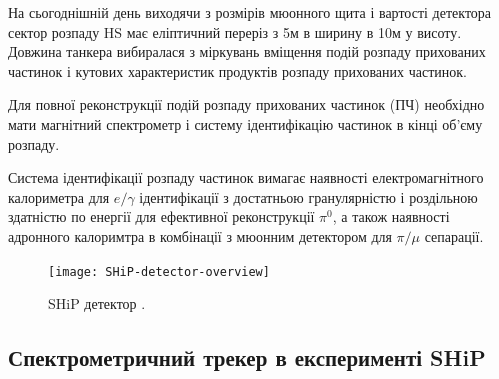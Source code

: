 	На сьогоднішній день виходячи з розмірів мюонного щита і вартості детектора  сектор розпаду HS має еліптичний переріз з 5м в ширину в 10м у висоту. Довжина танкера вибиралася з міркувань вміщення подій розпаду прихованих частинок і кутових характеристик продуктів розпаду прихованих частинок.
	 
	 

	Для повної реконструкції подій розпаду прихованих частинок (ПЧ) необхідно мати магнітний спектрометр і систему ідентифікацію частинок в кінці об'єму розпаду. 

	Система ідентифікації розпаду частинок вимагає наявності електромагнітного калориметра для $e / \gamma$ ідентифікації з достатньою гранулярністю і роздільною здатністю по енергії для ефективної реконструкції $\pi^0$, а також наявності адронного калоримтра в комбінації з мюонним детектором для  $ \pi / \mu$ сепарації.
	
	
	
	\begin{figure}[!h]
	\centering
	\texttt{[image: SHiP-detector-overview]}
	\caption{SHiP детектор \cite{ship_TP}.}
	\end{figure}
	
	\subsection{Спектрометричний трекер в експерименті SHiP}
	
